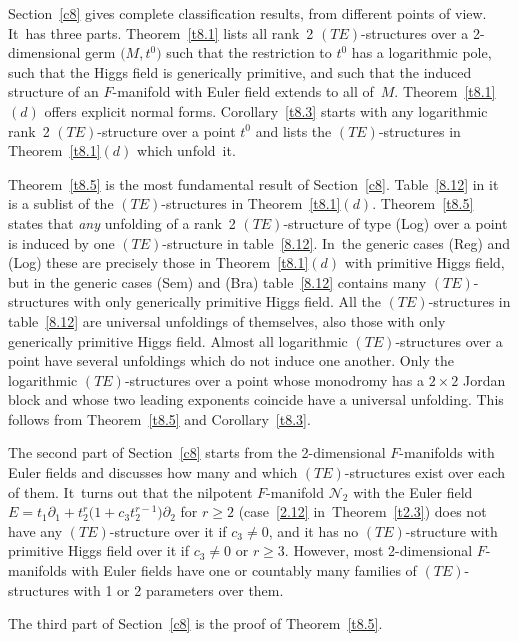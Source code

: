 \documentclass[pdftex]{sigma}%
\numberwithin{equation}{section}
\numberwithin{figure}{section}
\newcommand{\NN}{{\mathcal N}}
\newcommand{\paa}{\partial}
\begin{document}
Section~\ref{c8} gives complete classification results,
from different points of view. It~has three parts.
Theorem~\ref{t8.1} lists all rank~2 $(TE)$-structures
over a 2-dimensional germ $\big(M,t^0\big)$ such that the restriction
to $t^0$ has a logarithmic pole, such that the
Higgs field is generically primi\-tive,
and such that the induced structure of an $F$-manifold with
Euler field extends to all of~$M$. Theorem~\ref{t8.1}$(d)$
offers explicit normal forms.
Corollary~\ref{t8.3} starts with any logarithmic
rank~2 $(TE)$-structure over a point $t^0$ and lists
the $(TE)$-structures in Theorem~\ref{t8.1}$(d)$
which unfold~it.

Theorem~\ref{t8.5} is the most fundamental result of
Section~\ref{c8}. Table~\eqref{8.12} in it is a sublist
of the $(TE)$-structures in Theorem~\ref{t8.1}$(d)$. Theorem~\ref{t8.5} states that {\it any} unfolding of a rank~2
$(TE)$-structure of type (Log) over a point
is induced by one $(TE)$-structure in table~\eqref{8.12}. In~the generic cases (Reg) and (Log) these are precisely
those in Theorem~\ref{t8.1}$(d)$ with primitive Higgs field,
but in the generic cases (Sem) and (Bra) table~\eqref{8.12}
contains many $(TE)$-structures with only generically
primitive Higgs field. All the $(TE)$-structures in
table~\eqref{8.12} are universal unfoldings of themselves,
also those with only generically primitive Higgs field.
Almost all logarithmic $(TE)$-structures over a point
have several unfoldings which do not induce one another.
Only the logarithmic $(TE)$-structures over a point whose
monodromy has a $2\times 2$ Jordan block and whose
two leading exponents coincide have a universal unfolding.
This follows from Theorem~\ref{t8.5} and Corollary~\ref{t8.3}.

The second part of Section~\ref{c8} starts from the
2-dimensional $F$-manifolds with Euler fields and
discusses how many and which $(TE)$-structures exist over
each of them. It~turns out that the nilpotent $F$-manifold
$\NN_2$ with the Euler field
$E=t_1\paa_1+t_2^r\big(1+c_3t_2^{r-1}\big)\paa_2$ for $r\geq 2$
(case~\eqref{2.12} in~Theorem~\ref{t2.3}) does not have
any $(TE)$-structure over it if $c_3\neq 0$,
and it has no $(TE)$-structure with primitive Higgs field
over it if $c_3\neq 0$ or $r\geq 3$.
However, most 2-dimensional $F$-manifolds with Euler fields
have one or countably many families of $(TE)$-structures
with 1 or 2 parameters over them.

The third part of Section~\ref{c8} is the proof of Theorem~\ref{t8.5}.
\end{document}

